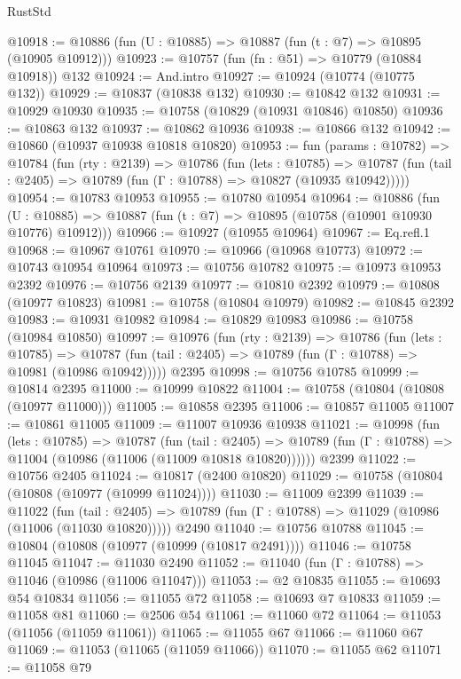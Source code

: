 \begin{lexlean}{RustStd}
\begin{coremodule}
@10918 := @10886 (fun (U : @10885) => @10887 (fun (t : @7) => @10895 (@10905 @10912)))
@10923 := @10757 (fun (fn : @51) => @10779 (@10884 @10918)) @132
@10924 := And.intro
@10927 := @10924 (@10774 (@10775 @132))
@10929 := @10837 (@10838 @132)
@10930 := @10842 @132
@10931 := @10929 @10930
@10935 := @10758 (@10829 (@10931 @10846) @10850)
@10936 := @10863 @132
@10937 := @10862 @10936
@10938 := @10866 @132
@10942 := @10860 (@10937 @10938 @10818 @10820)
@10953 := fun (params : @10782) =>
  @10784
    (fun (rty : @2139) =>
    @10786
      (fun (lets : @10785) =>
      @10787 (fun (tail : @2405) => @10789 (fun (Γ : @10788) => @10827 (@10935 @10942)))))
@10954 := @10783 @10953
@10955 := @10780 @10954
@10964 := @10886
    (fun (U : @10885) => @10887 (fun (t : @7) => @10895 (@10758 (@10901 @10930 @10776) @10912)))
@10966 := @10927 (@10955 @10964)
@10967 := Eq.refl.{1}
@10968 := @10967 @10761
@10970 := @10966 (@10968 @10773)
@10972 := @10743 @10954 @10964
@10973 := @10756 @10782
@10975 := @10973 @10953 @2392
@10976 := @10756 @2139
@10977 := @10810 @2392
@10979 := @10808 (@10977 @10823)
@10981 := @10758 (@10804 @10979)
@10982 := @10845 @2392
@10983 := @10931 @10982
@10984 := @10829 @10983
@10986 := @10758 (@10984 @10850)
@10997 := @10976
    (fun (rty : @2139) =>
    @10786
      (fun (lets : @10785) =>
      @10787 (fun (tail : @2405) => @10789 (fun (Γ : @10788) => @10981 (@10986 @10942)))))
    @2395
@10998 := @10756 @10785
@10999 := @10814 @2395
@11000 := @10999 @10822
@11004 := @10758 (@10804 (@10808 (@10977 @11000)))
@11005 := @10858 @2395
@11006 := @10857 @11005
@11007 := @10861 @11005
@11009 := @11007 @10936 @10938
@11021 := @10998
    (fun (lets : @10785) =>
    @10787
      (fun (tail : @2405) =>
      @10789 (fun (Γ : @10788) => @11004 (@10986 (@11006 (@11009 @10818 @10820))))))
    @2399
@11022 := @10756 @2405
@11024 := @10817 (@2400 @10820)
@11029 := @10758 (@10804 (@10808 (@10977 (@10999 @11024))))
@11030 := @11009 @2399
@11039 := @11022
    (fun (tail : @2405) => @10789 (fun (Γ : @10788) => @11029 (@10986 (@11006 (@11030 @10820)))))
    @2490
@11040 := @10756 @10788
@11045 := @10804 (@10808 (@10977 (@10999 (@10817 @2491))))
@11046 := @10758 @11045
@11047 := @11030 @2490
@11052 := @11040 (fun (Γ : @10788) => @11046 (@10986 (@11006 @11047)))
@11053 := @2 @10835
@11055 := @10693 @54 @10834
@11056 := @11055 @72
@11058 := @10693 @7 @10833
@11059 := @11058 @81
@11060 := @2506 @54
@11061 := @11060 @72
@11064 := @11053 (@11056 (@11059 @11061))
@11065 := @11055 @67
@11066 := @11060 @67
@11069 := @11053 (@11065 (@11059 @11066))
@11070 := @11055 @62
@11071 := @11058 @79

\end{coremodule}
\end{lexlean}
